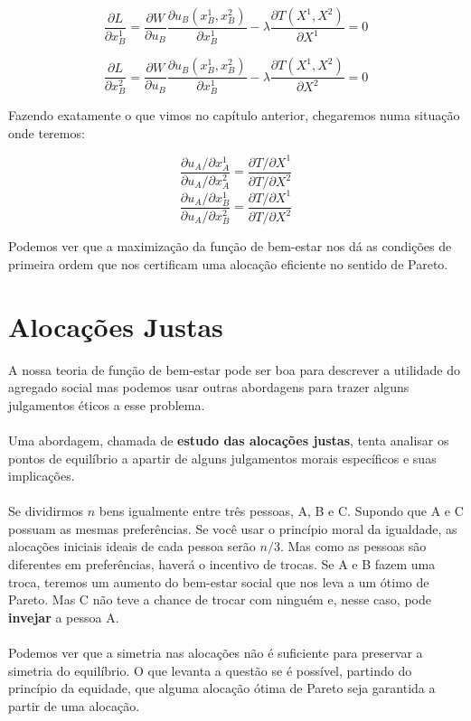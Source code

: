 \documentclass[a4paper,11pt,oneside]{book}
\theoremstyle{definition}
\theoremstyle{break}
\begin{document}
$$ \frac{\partial L}{\partial x_B^1} = \frac{\partial W}{\partial u_B} \frac{\partial u_B(x_B^1,x_B^2)}{\partial x_B^1} - \lambda \frac{\partial T(X^1,X^2)}{\partial X^1} = 0 $$

$$ \frac{\partial L}{\partial x_B^2} = \frac{\partial W}{\partial u_B} \frac{\partial u_B(x_B^1,x_B^2)}{\partial x_B^1} - \lambda \frac{\partial T(X^1,X^2)}{\partial X^2} = 0 $$

Fazendo exatamente o que vimos no capítulo anterior, chegaremos numa situação onde teremos:

$$ \frac{\partial u_A / \partial x_A^1}{\partial u_A / \partial x_A^2} = \frac{\partial T / \partial X^1}{\partial T / \partial X^2} $$
$$ \frac{\partial u_A / \partial x_B^1}{\partial u_A / \partial x_B^2} = \frac{\partial T / \partial X^1}{\partial T / \partial X^2} $$

Podemos ver que a maximização da função de bem-estar nos dá as condições de primeira ordem que nos certificam uma alocação eficiente no sentido de Pareto.

\section{Alocações Justas}

A nossa teoria de função de bem-estar pode ser boa para descrever a utilidade do agregado social mas podemos usar outras abordagens para trazer alguns julgamentos éticos a esse problema.
\\~\\
Uma abordagem, chamada de \textbf{estudo das alocações justas}, tenta analisar os pontos de equilíbrio a apartir de alguns julgamentos morais específicos e suas implicações.
\\~\\
Se dividirmos $n$ bens igualmente entre três pessoas, A, B e C. Supondo que A e C possuam as mesmas preferências. Se você usar o princípio moral da igualdade, as alocações iniciais ideais de cada pessoa serão $n/3$. Mas como as pessoas são diferentes em preferências, haverá o incentivo de trocas. Se A e B fazem uma troca, teremos um aumento do bem-estar social que nos leva a um ótimo de Pareto. Mas C não teve a chance de trocar com ninguém e, nesse caso, pode \textbf{invejar} a pessoa A.
\\~\\
Podemos ver que a simetria nas alocações não é suficiente para preservar a simetria do equilíbrio. O que levanta a questão se é possível, partindo do princípio da equidade, que alguma alocação ótima de Pareto seja garantida a partir de uma alocação.
\end{document}
